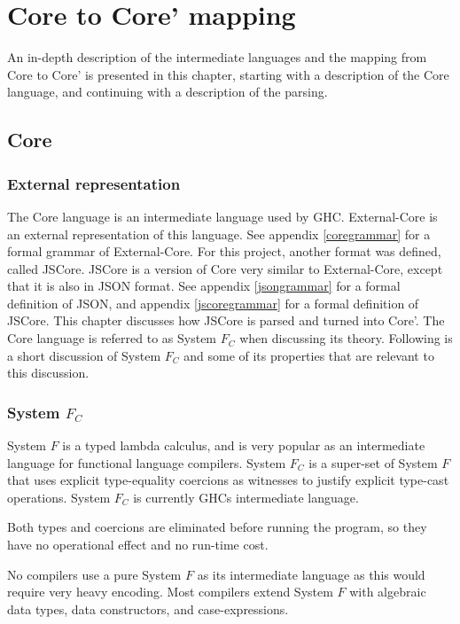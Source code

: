 
\chapter{Core to Core' mapping}
\label{chap:rewrite}

An in-depth description of the intermediate languages and the mapping from
Core to Core' is presented in this chapter, 
starting with a description of the Core language, and continuing with a 
description of the parsing. 

\section{Core}

\subsection*{External representation}

The Core language is an intermediate language used by GHC. External-Core
is an external representation of this language. See appendix 
\ref{coregrammar} for a formal grammar of External-Core. For this project,
another format was defined, called JSCore. JSCore is a version of Core
very similar to External-Core, except that it is also in JSON format. 
See appendix \ref{jsongrammar} for a formal definition of JSON, and 
appendix \ref{jscoregrammar} for a formal definition of JSCore. This
chapter discusses how JSCore is parsed and turned into Core'. The Core
language is referred to as System $F_C$ when discussing its theory.
Following is a short discussion of System $F_C$ and some of its 
properties that are relevant to this discussion.

\subsection*{System $F_C$}

System $F$ is a typed lambda calculus, and is very popular as an intermediate language
for functional language compilers. System $F_C$ is a super-set of System $F$ 
that uses explicit type-equality coercions as witnesses to justify explicit
type-cast operations. System $F_C$ is currently GHCs intermediate language.
\cite{sulzmann2007system}

Both types and coercions are eliminated before running the program, so they have
no operational effect and no run-time cost.
\cite{sulzmann2007system}

No compilers use a pure System $F$ as its intermediate language as this would
require very heavy encoding. Most compilers extend System $F$ with algebraic
data types, data constructors, and case-expressions.
\cite{sulzmann2007system}

